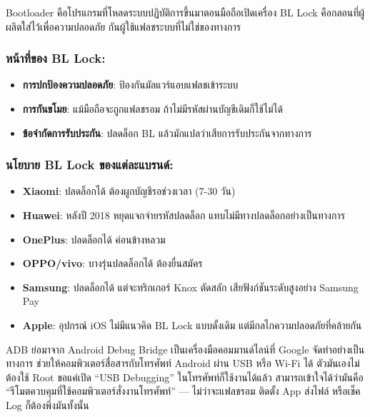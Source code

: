 
Bootloader คือโปรแกรมที่โหลดระบบปฏิบัติการขึ้นมาตอนมือถือเปิดเครื่อง BL Lock คือกลอนที่ผู้ผลิตใส่ไว้เพื่อความปลอดภัย กันผู้ใช้แฟลชระบบที่ไม่ใช่ของทางการ

\subsubsection*{หน้าที่ของ BL Lock:}

\begin{itemize}
  \item \textbf{การปกป้องความปลอดภัย}: ป้องกันมัลแวร์แอบแฟลชเข้าระบบ
  \item \textbf{การกันขโมย}: แม้มือถือจะถูกแฟลชรอม ถ้าไม่มีรหัสผ่านบัญชีเดิมก็ใช้ไม่ได้
  \item \textbf{ข้อจำกัดการรับประกัน}: ปลดล็อก BL แล้วมักแปลว่าเสียการรับประกันจากทางการ
\end{itemize}

\subsubsection*{นโยบาย BL Lock ของแต่ละแบรนด์:}

\begin{itemize}
  \item \textbf{Xiaomi}: ปลดล็อกได้ ต้องผูกบัญชีรอช่วงเวลา (7-30 วัน)
  \item \textbf{Huawei}: หลังปี 2018 หยุดแจกจ่ายรหัสปลดล็อก แทบไม่มีทางปลดล็อกอย่างเป็นทางการ
  \item \textbf{OnePlus}: ปลดล็อกได้ ค่อนข้างหลวม
  \item \textbf{OPPO/vivo}: บางรุ่นปลดล็อกได้ ต้องยื่นสมัคร
  \item \textbf{Samsung}: ปลดล็อกได้ แต่จะทริกเกอร์ Knox ตัดสลัก เสียฟังก์ชันระดับสูงอย่าง Samsung Pay
  \item \textbf{Apple}: อุปกรณ์ iOS ไม่มีแนวคิด BL Lock แบบดั้งเดิม แต่มีกลไกความปลอดภัยที่คล้ายกัน
\end{itemize}


ADB ย่อมาจาก Android Debug Bridge เป็นเครื่องมือคอมมานด์ไลน์ที่ Google จัดทำอย่างเป็นทางการ ช่วยให้คอมพิวเตอร์สื่อสารกับโทรศัพท์ Android ผ่าน USB หรือ Wi-Fi ได้ ตัวมันเองไม่ต้องใช้ Root ขอแค่เปิด “USB Debugging” ในโทรศัพท์ก็ใช้งานได้แล้ว สามารถเข้าใจได้ว่ามันคือ “รีโมตควบคุมที่ใช้คอมพิวเตอร์สั่งงานโทรศัพท์” — ไม่ว่าจะแฟลชรอม ติดตั้ง App ส่งไฟล์ หรือเช็ค Log ก็ต้องพึ่งมันทั้งนั้น

